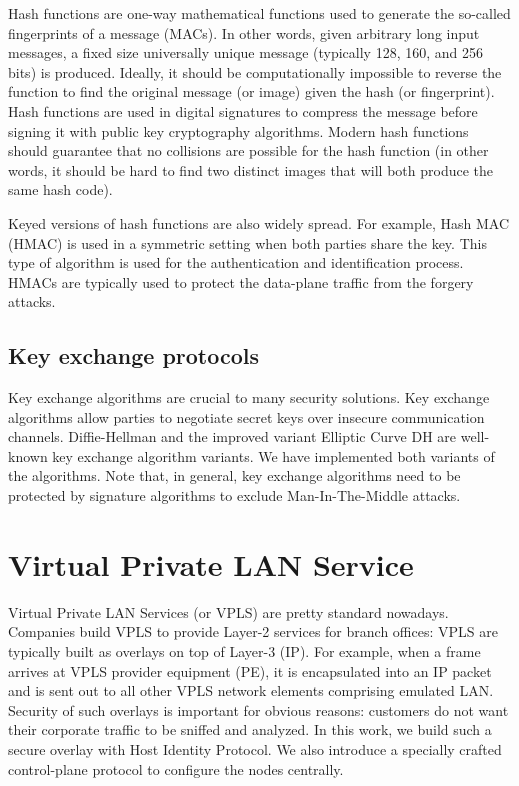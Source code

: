 Hash functions are one-way mathematical functions used to generate the so-called 
fingerprints of a message (MACs). In other words, given arbitrary long input messages, 
a fixed size universally unique message (typically 128, 160, and 256 bits) is produced. 
Ideally, it should be computationally impossible to reverse the function to find the 
original message (or image) given the hash (or fingerprint). Hash functions are used 
in digital signatures to compress the message before signing it with public key 
cryptography algorithms. Modern hash functions should guarantee that no collisions 
are possible for the hash function (in other words, it should be hard to find two 
distinct images that will both produce the same hash code). 

Keyed versions of hash functions are also widely spread. For example, Hash MAC (HMAC) 
is used in a symmetric setting when both parties share the key. This type of algorithm 
is used for the authentication and identification process. HMACs are typically used 
to protect the data-plane traffic from the forgery attacks. 


\subsection{Key exchange protocols}

Key exchange algorithms are crucial to many security solutions. Key exchange algorithms 
allow parties to negotiate secret keys over insecure communication channels. Diffie-Hellman 
and the improved variant Elliptic Curve DH are well-known key exchange algorithm variants. 
We have implemented both variants of the algorithms. Note that, in general, key exchange 
algorithms need to be protected by signature algorithms to exclude Man-In-The-Middle attacks.

\section{Virtual Private LAN Service}

Virtual Private LAN Services (or VPLS) are pretty standard nowadays. Companies build VPLS to 
provide Layer-2 services for branch offices: VPLS are typically built as overlays on top of 
Layer-3 (IP). For example, when a frame arrives at VPLS provider equipment (PE), it is encapsulated 
into an IP packet and is sent out to all other VPLS network elements comprising emulated LAN. 
Security of such overlays is important for obvious reasons: customers do not want their corporate 
traffic to be sniffed and analyzed. In this work, we build such a secure overlay with Host Identity 
Protocol. We also introduce a specially crafted control-plane protocol to configure the nodes centrally. 


